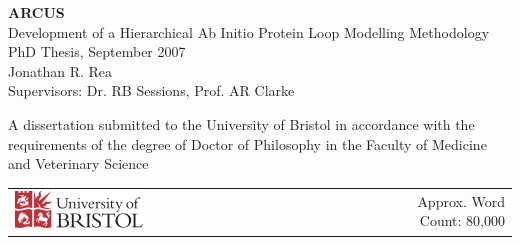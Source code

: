 \begin{titlepage}
\begin{center}

{\vspace*{\fill}}
\noindent

\vspace{-2.5cm}

\begin{scshape}
\begin{doublespace}

\Huge{\bf{ARCUS}} \\[1.0cm]
\LARGE Development of a Hierarchical Ab Initio Protein Loop Modelling Methodology \\[2.0cm]

\Large PhD Thesis, September 2007 \\
\LARGE Jonathan R. Rea \\
\Large Supervisors: Dr. RB Sessions, Prof. AR Clarke \\[2.0cm]

\end{doublespace}
\end{scshape}

\Large{A dissertation submitted to the University of Bristol in accordance with the requirements of the degree of Doctor of Philosophy in the Faculty of Medicine and Veterinary Science}\\[1cm]


{\vspace*{\fill}}

\begin{tabularx}{0.95\textwidth}{lXr}
\includegraphics[width=0.35\textwidth]{img/uob-logo-red.pdf} & & Approx. Word Count: 80,000 \\
\end{tabularx}


\end{center}
\end{titlepage}
